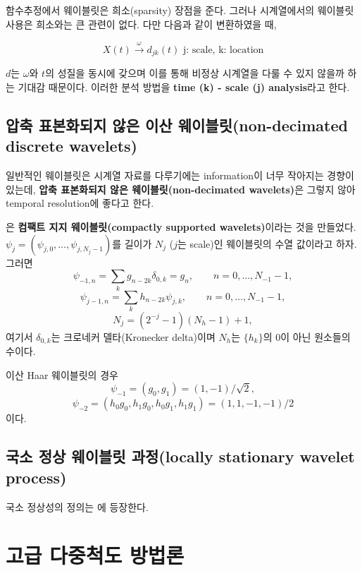 \documentclass[b5paper,]{scrbook}
\theoremstyle{plain}
\theoremstyle{definition}
\numberwithin{equation}{section}
\let\BeginKnitrBlock\begin \let\EndKnitrBlock\end
\begin{document}
함수추정에서 웨이블릿은 희소(sparsity) 장점을 준다. 그러나 시계열에서의 웨이블릿 사용은 희소와는 큰 관련이 없다. 다만 다음과 같이 변환하였을 때,

\[X(t) \stackrel{\omega}{\rightarrow}d_{jk}(t) \text{ j: scale, k: location}\]

\(d\)는 \(\omega\)와 \(t\)의 성질을 동시에 갖으며 이를 통해 비정상 시계열을 다룰 수 있지 않을까 하는 기대감 때문이다. 이러한 분석 방법을 \textbf{time (k) - scale (j) analysis}라고 한다.

\hypertarget{----non-decimated-discrete-wavelets}{%
\section{압축 표본화되지 않은 이산 웨이블릿(non-decimated discrete wavelets)}\label{----non-decimated-discrete-wavelets}}

일반적인 웨이블릿은 시계열 자료를 다루기에는 information이 너무 작아지는 경향이 있는데, \textbf{압축 표본화되지 않은 웨이블릿(non-decimated wavelets)}은 그렇지 않아 temporal resolution에 좋다고 한다.

\citep{Nason2000}은 \textbf{컴팩트 지지 웨이블릿(compactly supported wavelets)}이라는 것을 만들었다. \(\psi_{j}=(\psi_{j,0},\ldots,\psi_{j,N_{j}-1})\)를 길이가 \(N_{j}\) (\(j\)는 scale)인 웨이블릿의 수열 값이라고 하자. 그러면
\[\psi_{-1,n}=\sum_{k}g_{n-2k}\delta_{0,k}=g_{n},\qquad{n=0,\ldots, N_{-1}-1},\]
\[\psi_{j-1,n}=\sum_{k}h_{n-2k}\psi_{j,k},\qquad{n=0,\ldots, N_{-1}-1},\]
\[N_{j}=(2^{-j}-1)(N_{h}-1)+1,\]
여기서 \(\delta_{0,k}\)는 크로네커 델타(Kronecker delta)이며 \(N_{h}\)는 \(\{h_{k}\}\)의 0이 아닌 원소들의 수이다.

\BeginKnitrBlock{example}[이산 Haar 웨이블릿]
\protect\hypertarget{exm:unnamed-chunk-325}{}{\label{exm:unnamed-chunk-325} {} }이산 Haar 웨이블릿의 경우
\[\psi_{-1}=(g_{0},g_{1})=(1,-1)/\sqrt{2},\]
\[\psi_{-2}=(h_{0}g_{0},h_{1}g_{0},h_{0}g_{1},h_{1}g_{1})=(1,1,-1,-1)/2\]
이다.
\EndKnitrBlock{example}

\hypertarget{---locally-stationary-wavelet-process}{%
\section{국소 정상 웨이블릿 과정(locally stationary wavelet process)}\label{---locally-stationary-wavelet-process}}

국소 정상성의 정의는 \citep{Nason2000}에 등장한다.

\hypertarget{admultiscale}{%
\chapter{고급 다중척도 방법론}\label{admultiscale}}
\end{document}
